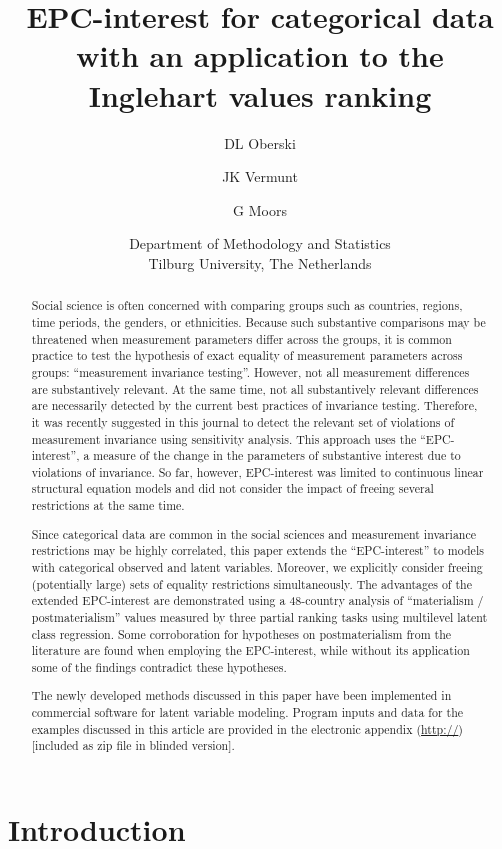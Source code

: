 \documentclass[letterpaper,12pt]{article}
\title{EPC-interest for categorical data with an application to the Inglehart values ranking}
\date{}
\author{DL Oberski \and JK Vermunt \and G Moors
\and
Department of Methodology and Statistics\\
Tilburg University, The Netherlands}
\begin{document}
\maketitle



\begin{abstract}
Social science is often concerned with comparing groups such as countries, regions, time periods, the genders, or ethnicities.
Because such substantive comparisons may be threatened when measurement parameters differ across the groups, it is common practice to test the hypothesis of exact equality of measurement parameters across groups:  ``measurement invariance testing''. However, not all measurement differences are substantively relevant. At the same time,  not all substantively relevant differences are necessarily detected by the current best practices of invariance testing. Therefore, it was recently suggested in this journal to detect the relevant set of violations of measurement invariance using sensitivity analysis. This approach uses the ``EPC-interest'',  a measure of the change in the parameters of substantive interest due to violations of invariance. So far, however, EPC-interest was limited to continuous linear structural equation models and did not consider the impact of freeing several restrictions at the same time. 

Since categorical data are common in the social sciences and measurement invariance restrictions may be highly correlated, this paper extends the ``EPC-interest'' to models with categorical observed and latent variables. Moreover, we explicitly consider freeing (potentially large) sets of equality restrictions simultaneously. The advantages of the extended EPC-interest are demonstrated using a 48-country analysis of ``materialism / postmaterialism'' values measured by three partial ranking tasks using multilevel latent class regression. Some corroboration for hypotheses on postmaterialism from the literature are found when employing the EPC-interest, while without its application some of the findings contradict these hypotheses.

The newly developed methods discussed in this paper have been implemented in commercial software for latent variable modeling. Program inputs and data for the examples discussed in this article are provided in the electronic appendix (\url{http://}) [included as zip file in blinded version].
\end{abstract}

\section{Introduction}
\end{document}
